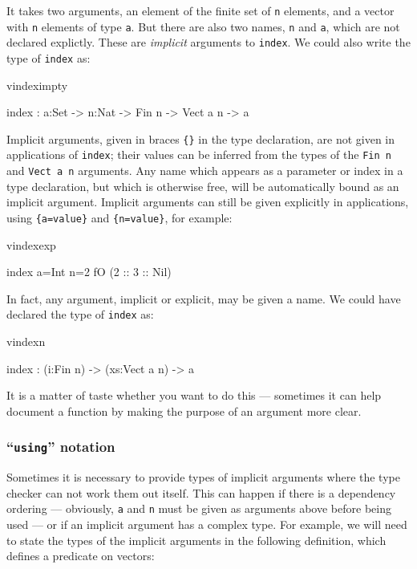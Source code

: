 \noindent
It takes two arguments, an element of the finite set of \texttt{n} elements, and a vector
with \texttt{n} elements of type \texttt{a}. But there are also two names, 
\texttt{n} and \texttt{a}, which are not declared explictly. These are \emph{implicit}
arguments to \texttt{index}. We could also write the type of \texttt{index} as:

\begin{SaveVerbatim}{vindeximpty}

index : {a:Set} -> {n:Nat} -> Fin n -> Vect a n -> a

\end{SaveVerbatim}

\noindent
Implicit arguments, given in braces \texttt{\{\}} in the type declaration, are not given in
applications of \texttt{index}; their values can be inferred from the types of
the \texttt{Fin n} and \texttt{Vect a n} arguments. Any name which appears as a parameter
or index in a type declaration, but which is otherwise free, will be automatically
bound as an implicit argument.
Implicit arguments can still be given explicitly in applications, using
\texttt{\{a=value\}} and \texttt{\{n=value\}}, for example:

\begin{SaveVerbatim}{vindexexp}

index {a=Int} {n=2} fO (2 :: 3 :: Nil)

\end{SaveVerbatim}

\noindent
In fact, any argument, implicit or explicit, may be given a name. We could have
declared the type of \texttt{index} as:

\begin{SaveVerbatim}{vindexn}

index : (i:Fin n) -> (xs:Vect a n) -> a

\end{SaveVerbatim}

\noindent
It is a matter of taste whether you want to do this --- sometimes it can help
document a function by making the purpose of an argument more clear.

\subsubsection{``\texttt{using}'' notation}

Sometimes it is necessary to provide types of implicit arguments where
the type checker can not work them out itself. This can happen if there is a
dependency ordering --- obviously, \texttt{a} and \texttt{n} must be given as arguments above
before being used --- or if an implicit argument has a complex type. For example,
we will need to state the types of the implicit arguments in the following
definition, which defines a predicate on vectors:

